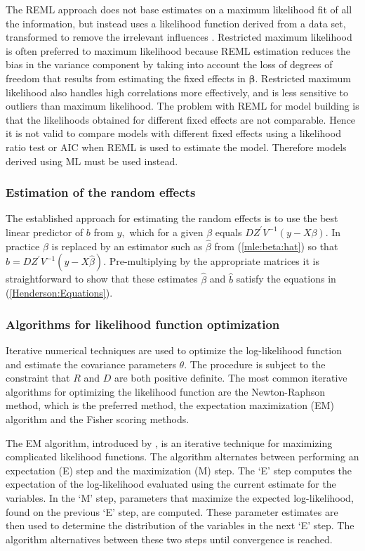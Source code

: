 \documentclass[MAIN.tex]{subfiles}
\begin{document}
	The REML approach does not base estimates on a maximum likelihood fit of all the information, but instead uses a likelihood function derived from a data set, transformed to remove the irrelevant influences \citep{REMLDefine}.
	Restricted maximum likelihood is often preferred to maximum likelihood because REML estimation reduces the bias in the variance component by taking into account the loss of degrees of freedom that results
	from estimating the fixed effects in $\boldsymbol{\beta}$. Restricted maximum likelihood also handles high correlations more effectively, and is less sensitive to outliers than maximum likelihood.  The problem with REML for model building is that the likelihoods obtained for different fixed effects are not comparable. Hence it is not valid to compare models with different fixed effects using a likelihood ratio test or AIC when REML is used to
	estimate the model. Therefore models derived using ML must be used instead.
	
	\subsubsection{Estimation of the random effects}
	
	The established approach for estimating the random effects is to use the best linear predictor of $b$ from $y,$ which for a given $\beta$ equals $DZ^\prime V^{-1}(y - X \beta).$ In practice $\beta$ is replaced by an estimator such as $\hat{\beta}$ from (\ref{mle:beta:hat}) so that $\hat{b} = DZ^\prime V^{-1}(y - X \hat{\beta}).$ Pre-multiplying by the appropriate matrices it is straightforward to show that these estimates $\hat{\beta}$ and $\hat{b}$ satisfy the equations in (\ref{Henderson:Equations}).
	
	\subsubsection{Algorithms for likelihood function optimization}Iterative numerical techniques are used to optimize the log-likelihood function and estimate the covariance parameters $\theta$. The procedure is subject to the constraint that $R$ and $D$ are both positive definite. The most common iterative algorithms for optimizing the likelihood function are the Newton-Raphson method, which is the preferred method, the expectation maximization (EM) algorithm and the Fisher scoring methods.
	
	The EM algorithm, introduced by \citet{EM}, is an iterative technique for maximizing complicated likelihood functions. The algorithm alternates between performing an expectation (E) step
	and the maximization (M) step. The `E' step computes the expectation of the log-likelihood evaluated using the current
	estimate for the variables. In the `M' step, parameters that maximize the expected log-likelihood, found on the previous `E' step, are computed. These parameter estimates are then used to determine the distribution of the variables in the next `E' step. The algorithm alternatives between these two steps until convergence is reached.
	
\end{document}
